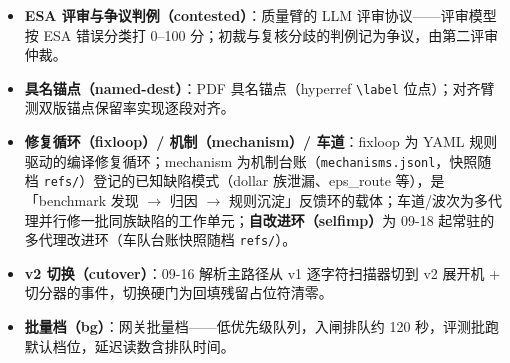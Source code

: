 \begin{itemize}
  \item \textbf{ESA 评审与争议判例（contested）}：质量臂的 LLM 评审协议——评审模型按 ESA 错误分类打 0--100 分；初裁与复核分歧的判例记为争议，由第二评审仲裁。
  \item \textbf{具名锚点（named-dest）}：PDF 具名锚点（hyperref \verb|\label| 位点）；对齐臂测双版锚点保留率实现逐段对齐。
  \item \textbf{修复循环（fixloop）/ 机制（mechanism）/ 车道}：fixloop 为 YAML 规则驱动的编译修复循环；mechanism 为机制台账（\texttt{mechanisms.jsonl}，快照随档 \texttt{refs/}）登记的已知缺陷模式（dollar 族泄漏、eps\_route 等），是「benchmark 发现 $\to$ 归因 $\to$ 规则沉淀」反馈环的载体；车道/波次为多代理并行修一批同族缺陷的工作单元；\textbf{自改进环（selfimp）}为 09-18 起常驻的多代理改进环（车队台账快照随档 \texttt{refs/}）。
  \item \textbf{v2 切换（cutover）}：09-16 解析主路径从 v1 逐字符扫描器切到 v2 展开机 + 切分器的事件，切换硬门为回填残留占位符清零。
  \item \textbf{批量档（bg）}：网关批量档——低优先级队列，入闸排队约 120 秒，评测批跑默认档位，延迟读数含排队时间。
\end{itemize}
